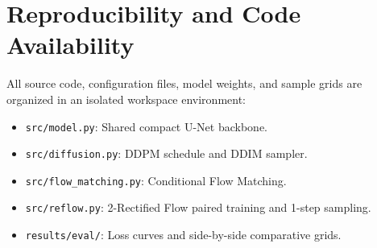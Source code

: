 \documentclass[11pt,a4paper]{article}
\begin{document}
\section*{Reproducibility and Code Availability}
All source code, configuration files, model weights, and sample grids are organized in an isolated workspace environment:
\begin{itemize}
    \item \texttt{src/model.py}: Shared compact U-Net backbone.
    \item \texttt{src/diffusion.py}: DDPM schedule and DDIM sampler.
    \item \texttt{src/flow\_matching.py}: Conditional Flow Matching.
    \item \texttt{src/reflow.py}: 2-Rectified Flow paired training and 1-step sampling.
    \item \texttt{results/eval/}: Loss curves and side-by-side comparative grids.
\end{itemize}
\end{document}
